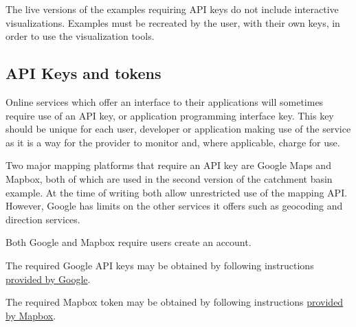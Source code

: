 \documentclass[utf8]{frontiers_suppmat} %
\begin{document}
The live versions of the examples requiring API keys do not include interactive visualizations. Examples must be
recreated by the user, with their own keys, in order to use the visualization tools.

\subsection{API Keys and tokens}\label{api-keys}

Online services which offer an interface to their applications will
sometimes require use of an API key, or application programming
interface key. This key should be unique for each user, developer or
application making use of the service as it is a way for the provider to
monitor and, where applicable, charge for use.

Two major mapping platforms that require an API key are Google Maps
and Mapbox, both of which are used in the second version of the
catchment basin example. At the time of writing both allow
unrestricted use of the mapping API. However, Google has limits on the
other services it offers such as geocoding and direction services.

Both Google and Mapbox require users create an account.

The required Google API keys may be obtained by following instructions \href{https://developers.google.com/maps/documentation/embed/get-api-key}{provided by Google}.

The required Mapbox token may be obtained by following instructions \href{https://www.mapbox.com/account/access-tokens}{provided by Mapbox}.
\end{document}
